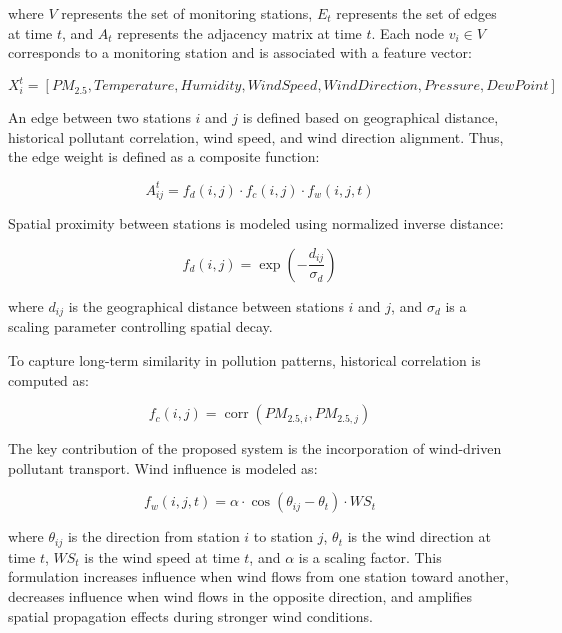 where $V$ represents the set of monitoring stations, $E_t$ represents the set of edges at time $t$, and $A_t$ represents the adjacency matrix at time $t$. Each node $v_i \in V$ corresponds to a monitoring station and is associated with a feature vector:

\begin{equation}
X_i^t = [PM_{2.5}, Temperature, Humidity, WindSpeed, WindDirection, Pressure, DewPoint]
\end{equation}

An edge between two stations $i$ and $j$ is defined based on geographical distance, historical pollutant correlation, wind speed, and wind direction alignment. Thus, the edge weight is defined as a composite function:

\begin{equation}
A_{ij}^t = f_d(i,j) \cdot f_c(i,j) \cdot f_w(i,j,t)
\end{equation}

Spatial proximity between stations is modeled using normalized inverse distance:

\begin{equation}
f_d(i,j) = \exp\left(-\frac{d_{ij}}{\sigma_d}\right)
\end{equation}

where $d_{ij}$ is the geographical distance between stations $i$ and $j$, and $\sigma_d$ is a scaling parameter controlling spatial decay.

To capture long-term similarity in pollution patterns, historical correlation is computed as:

\begin{equation}
f_c(i,j) = \operatorname{corr}(PM_{2.5,i}, PM_{2.5,j})
\end{equation}

The key contribution of the proposed system is the incorporation of wind-driven pollutant transport. Wind influence is modeled as:

\begin{equation}
f_w(i,j,t) = \alpha \cdot \cos(\theta_{ij} - \theta_t) \cdot WS_t
\end{equation}

where $\theta_{ij}$ is the direction from station $i$ to station $j$, $\theta_t$ is the wind direction at time $t$, $WS_t$ is the wind speed at time $t$, and $\alpha$ is a scaling factor. This formulation increases influence when wind flows from one station toward another, decreases influence when wind flows in the opposite direction, and amplifies spatial propagation effects during stronger wind conditions.

